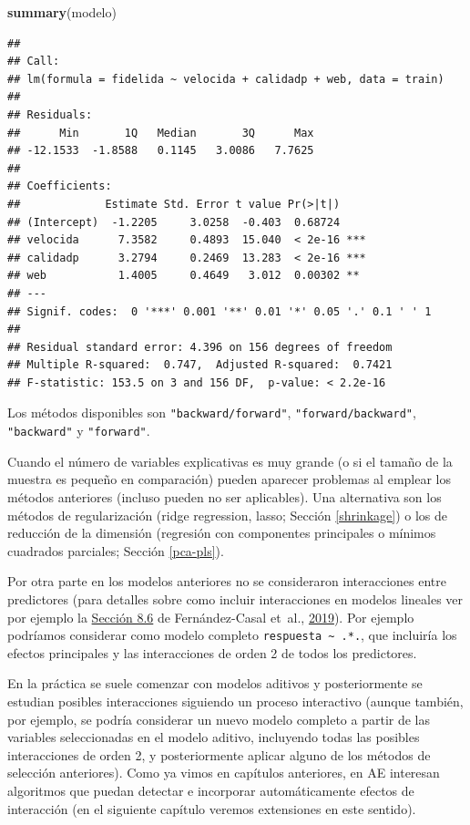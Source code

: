 \documentclass[
  spanish,
]{book}
\newenvironment{Shaded}{\begin{snugshade}}{\end{snugshade}}
\newcommand{\KeywordTok}[1]{\textcolor[rgb]{0.13,0.29,0.53}{\textbf{#1}}}
\newcommand{\NormalTok}[1]{#1}
\theoremstyle{break}
\theoremstyle{definition}
\theoremstyle{definition}
\theoremstyle{definition}
\theoremstyle{remark}
\begin{document}
\begin{Shaded}
\begin{Highlighting}[]
\KeywordTok{summary}\NormalTok{(modelo)}
\end{Highlighting}
\end{Shaded}

\begin{verbatim}
## 
## Call:
## lm(formula = fidelida ~ velocida + calidadp + web, data = train)
## 
## Residuals:
##      Min       1Q   Median       3Q      Max 
## -12.1533  -1.8588   0.1145   3.0086   7.7625 
## 
## Coefficients:
##             Estimate Std. Error t value Pr(>|t|)    
## (Intercept)  -1.2205     3.0258  -0.403  0.68724    
## velocida      7.3582     0.4893  15.040  < 2e-16 ***
## calidadp      3.2794     0.2469  13.283  < 2e-16 ***
## web           1.4005     0.4649   3.012  0.00302 ** 
## ---
## Signif. codes:  0 '***' 0.001 '**' 0.01 '*' 0.05 '.' 0.1 ' ' 1
## 
## Residual standard error: 4.396 on 156 degrees of freedom
## Multiple R-squared:  0.747,  Adjusted R-squared:  0.7421 
## F-statistic: 153.5 on 3 and 156 DF,  p-value: < 2.2e-16
\end{verbatim}

Los métodos disponibles son \texttt{"backward/forward"}, \texttt{"forward/backward"}, \texttt{"backward"} y \texttt{"forward"}.

Cuando el número de variables explicativas es muy grande (o si el tamaño de la muestra es pequeño en comparación) pueden aparecer problemas al emplear los métodos anteriores (incluso pueden no ser aplicables).
Una alternativa son los métodos de regularización (ridge regression, lasso; Sección \ref{shrinkage}) o los de reducción de la dimensión (regresión con componentes principales o mínimos cuadrados parciales; Sección \ref{pca-pls}).

Por otra parte en los modelos anteriores no se consideraron interacciones entre predictores (para detalles sobre como incluir interacciones en modelos lineales ver por ejemplo la \href{https://rubenfcasal.github.io/intror/modelos-lineales.html\#interacciones}{Sección 8.6} de Fernández-Casal et~al., \protect\hyperlink{ref-fernandez2019intror}{2019}).
Por ejemplo podríamos considerar como modelo completo \texttt{respuesta\ \textasciitilde{}\ .*.}, que incluiría los efectos principales y las interacciones de orden 2 de todos los predictores.

En la práctica se suele comenzar con modelos aditivos y posteriormente se estudian posibles interacciones siguiendo un proceso interactivo (aunque también, por ejemplo, se podría considerar un nuevo modelo completo a partir de las variables seleccionadas en el modelo aditivo, incluyendo todas las posibles interacciones de orden 2, y posteriormente aplicar alguno de los métodos de selección anteriores).
Como ya vimos en capítulos anteriores, en AE interesan algoritmos que puedan detectar e incorporar automáticamente efectos de interacción (en el siguiente capítulo veremos extensiones en este sentido).
\end{document}
